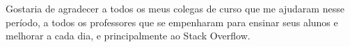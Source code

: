 Gostaria de agradecer a todos os meus colegas de curso que me ajudaram nesse período, a todos os professores que se empenharam para ensinar seus alunos e melhorar a cada dia, e principalmente ao Stack Overflow.